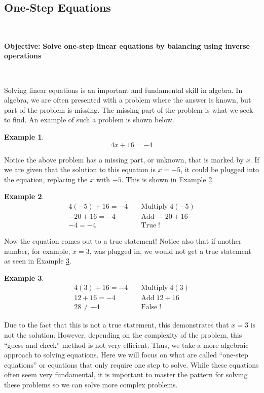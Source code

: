 \documentclass[11pt]{book}
\newcommand{\tmop}[1]{\ensuremath{\operatorname{#1}}}
\theoremstyle{definition}  %
\newtheorem{example}{Example}[chapter]
\begin{document}
\subsection{One-Step Equations}\par
~\par
{\textbf{Objective:}} {\textbf{Solve one-step linear equations by
balancing using inverse operations}}\par
~\par
Solving linear equations is an important and fundamental skill in algebra. In
algebra, we are often presented with a problem where the answer is known, but
part of the problem is missing. The missing part of the problem is what we
seek to find. An example of such a problem is shown below.

\begin{example}\label{Lin1}
\[ 4 x + 16 = - 4 \]
\end{example}
Notice the above problem has a missing part, or unknown, that is marked by
$x$. If we are given that the solution to this equation is $x=- 5$, it could be
plugged into the equation, replacing the $x$ with $- 5$. This is shown in
Example \ref{Lin2}.

\begin{example}\label{Lin2}
\begin{eqnarray*}
  4 (- 5) + 16 = - 4 &  & \tmop{Multiply} 4 (- 5)\\
  - 20 + 16 = - 4 &  & \tmop{Add} - 20 + 16\\
  - 4 = - 4 &  & \tmop{True} !
\end{eqnarray*}
\end{example}

Now the equation comes out to a true statement! Notice also that if another
number, for example, $x=3$, was plugged in, we would not get a true statement as
seen in Example \ref{Lin3}.

\begin{example}\label{Lin3}
 \begin{eqnarray*}
  4 (3) + 16 = - 4 &  & \tmop{Multiply} 4 (3)\\
  12 + 16 = - 4 &  & \tmop{Add} 12 + 16\\
  28 \neq - 4 &  & \tmop{False} !
\end{eqnarray*}
\end{example}
Due to the fact that this is not a true statement, this demonstrates that $x=3$
is not the solution. However, depending on the complexity of the problem, this
``guess and check'' method is not very efficient. Thus, we take a more
algebraic approach to solving equations. Here we will focus on what are called
``one-step equations'' or equations that only require one step to solve. While
these equations often seem very fundamental, it is important to master the
pattern for solving these problems so we can solve more complex problems.\par
~\par
\end{document}
